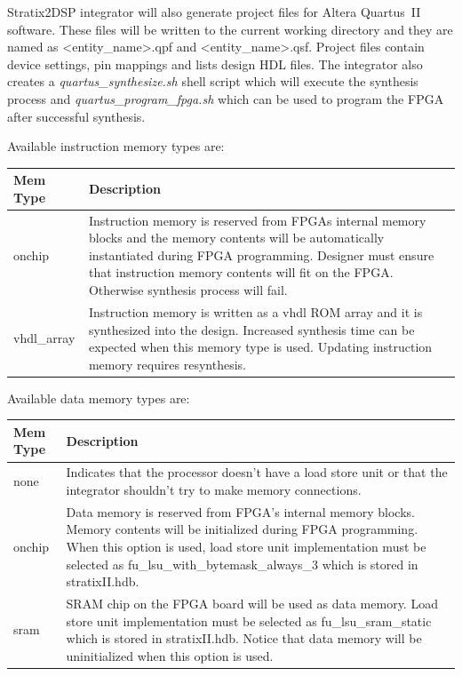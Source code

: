 \documentclass[twoside]{tceusermanual}
\begin{document}
Stratix2DSP integrator will also generate project files for Altera Quartus~II
software. These files will be written to the current working directory and they
are named as <entity\_name>.qpf and <entity\_name>.qsf. Project files contain
device settings, pin mappings and lists design HDL files. The integrator also
creates a \textit{quartus\_synthesize.sh} shell script which will execute the synthesis
process and \textit{quartus\_program\_fpga.sh} which can be used to program the FPGA
after successful synthesis.

Available instruction memory types are:
\begin{center}
\begin{longtable}[htb]{@{}p{}%
                     @{}p{}}

\textbf{Mem Type} &\textbf{Description} \\
\hline
onchip & Instruction memory is reserved from FPGAs internal memory blocks and
the memory contents will be automatically instantiated during FPGA programming.
Designer must ensure that instruction memory contents will fit on the FPGA.
Otherwise synthesis process will fail. \\
vhdl\_array & Instruction memory is written as a vhdl ROM array and it is
synthesized into the design. Increased synthesis time can be expected when this
memory type is used. Updating instruction memory requires resynthesis.
\end{longtable}
\end{center}

Available data memory types are:
\begin{center}
\begin{longtable}[htb]{@{}p{}%
                     @{}p{}}

\textbf{Mem Type} &\textbf{Description} \\
\hline
none & Indicates that the processor doesn't have a load store unit or that the
integrator shouldn't try to make memory connections. \\

onchip & Data memory is reserved from FPGA's internal memory blocks. Memory
contents will be initialized during FPGA programming. When this option is used,
load store unit implementation must be selected as
fu\_lsu\_with\_bytemask\_always\_3 which is stored in stratixII.hdb.\\

sram & SRAM chip on the FPGA board will be used as data memory. Load store unit
implementation must be selected as fu\_lsu\_sram\_static which is stored in
stratixII.hdb. Notice that data memory will be uninitialized when this option
is used.
\end{longtable}
\end{center}
\end{document}
